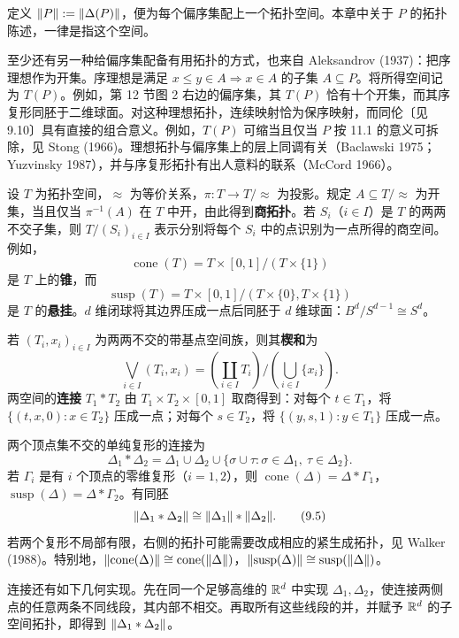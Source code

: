 定义 $\lVert P\rVert:=\lVert\Delta(P)\rVert$，便为每个偏序集配上一个拓扑空间。本章中关于 $P$ 的拓扑陈述，一律是指这个空间。

至少还有另一种给偏序集配备有用拓扑的方式，也来自 Aleksandrov (1937)：把序理想作为开集。序理想是满足 $x\le y\in A\Rightarrow x\in A$ 的子集 $A\subseteq P$。将所得空间记为 $T(P)$。例如，第 12 节图 2 右边的偏序集，其 $T(P)$ 恰有十个开集，而其序复形同胚于二维球面。对这种理想拓扑，连续映射恰为保序映射，而同伦〔见 9.10〕具有直接的组合意义。例如，$T(P)$ 可缩当且仅当 $P$ 按 11.1 的意义可拆除，见 Stong (1966)。理想拓扑与偏序集上的层上同调有关（Baclawski 1975；Yuzvinsky 1987），并与序复形拓扑有出人意料的联系（McCord 1966）。

设 $T$ 为拓扑空间，$\approx$ 为等价关系，$\pi:T\to T/{\approx}$ 为投影。规定 $A\subseteq T/{\approx}$ 为开集，当且仅当 $\pi^{-1}(A)$ 在 $T$ 中开，由此得到\textbf{商拓扑}。若 $S_i$（$i\in I$）是 $T$ 的两两不交子集，则 $T/(S_i)_{i\in I}$ 表示分别将每个 $S_i$ 中的点识别为一点所得的商空间。例如，
\[
\operatorname{cone}(T)=T\times[0,1]/(T\times\{1\})
\]
是 $T$ 上的\textbf{锥}，而
\[
\operatorname{susp}(T)=T\times[0,1]/(T\times\{0\},T\times\{1\})
\]
是 $T$ 的\textbf{悬挂}。$d$ 维闭球将其边界压成一点后同胚于 $d$ 维球面：$B^d/S^{d-1}\cong S^d$。

若 $(T_i,x_i)_{i\in I}$ 为两两不交的带基点空间族，则其\textbf{楔和}为
\[
\bigvee_{i\in I}(T_i,x_i)=\left(\coprod_{i\in I}T_i\right)\Big/\left(\bigcup_{i\in I}\{x_i\}\right).
\]
两空间的\textbf{连接} $T_1*T_2$ 由 $T_1\times T_2\times[0,1]$ 取商得到：对每个 $t\in T_1$，将 $\{(t,x,0):x\in T_2\}$ 压成一点；对每个 $s\in T_2$，将 $\{(y,s,1):y\in T_1\}$ 压成一点。

两个顶点集不交的单纯复形的连接为
\[
\Delta_1*\Delta_2=\Delta_1\cup\Delta_2\cup\{\sigma\cup\tau:\sigma\in\Delta_1,\ \tau\in\Delta_2\}.
\]
若 $\Gamma_i$ 是有 $i$ 个顶点的零维复形（$i=1,2$），则 $\operatorname{cone}(\Delta)=\Delta*\Gamma_1$，$\operatorname{susp}(\Delta)=\Delta*\Gamma_2$。有同胚
\begin{equation}
\lVert\Delta_1*\Delta_2\rVert\cong\lVert\Delta_1\rVert*\lVert\Delta_2\rVert.\tag{9.5}
\end{equation}
若两个复形不局部有限，右侧的拓扑可能需要改成相应的紧生成拓扑，见 Walker (1988)。特别地，$\lVert\operatorname{cone}(\Delta)\rVert\cong\operatorname{cone}(\lVert\Delta\rVert)$，$\lVert\operatorname{susp}(\Delta)\rVert\cong\operatorname{susp}(\lVert\Delta\rVert)$。

连接还有如下几何实现。先在同一个足够高维的 $\mathbb R^d$ 中实现 $\Delta_1,\Delta_2$，使连接两侧点的任意两条不同线段，其内部不相交。再取所有这些线段的并，并赋予 $\mathbb R^d$ 的子空间拓扑，即得到 $\lVert\Delta_1*\Delta_2\rVert$。

